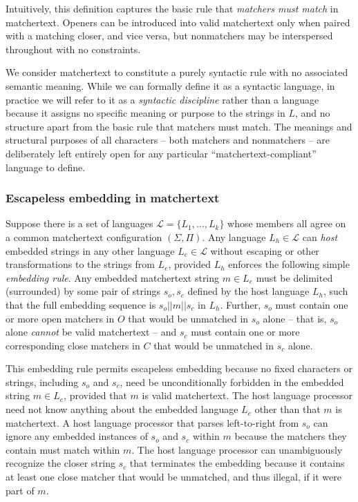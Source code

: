 Intuitively, this definition captures the basic rule
that \emph{matchers must match} in matchertext.
Openers can be introduced into valid matchertext
only when paired with a matching closer, and vice versa,
but nonmatchers may be interspersed throughout with no constraints.

We consider matchertext to constitute a purely syntactic rule
with no associated semantic meaning.
While we can formally define it as a syntactic language,
in practice we will refer to it as a \emph{syntactic discipline}
rather than a language
because it assigns no specific meaning or purpose to the strings in $L$,
and no structure apart from the basic rule that matchers must match.
The meanings and structural purposes of all characters --
both matchers and nonmatchers --
are deliberately left entirely open
for any particular ``matchertext-compliant'' language to define.


\subsubsection{Escapeless embedding in matchertext}
\label{sec:design:abstract:embed}

Suppose there is a set of languages $\mathcal{L} = \{L_1,\dots,L_k\}$
whose members all agree on a common  matchertext configuration $(\Sigma,\Pi)$.
Any language $L_h \in \mathcal{L}$ can \emph{host}
embedded strings in any other language $L_e \in \mathcal{L}$
without escaping or other transformations to the strings from $L_e$,
provided $L_h$ enforces the following simple \emph{embedding rule}.
Any embedded matchertext string $m \in L_e$ 
must be delimited (surrounded) by
some pair of strings $s_o, s_c$ defined by the host language $L_h$,
such that the full embedding sequence is $s_o || m || s_c$ in $L_h$.
Further, $s_o$ must contain one or more open matchers in $O$
that would be unmatched in $s_o$ alone --
that is, $s_o$ alone \emph{cannot} be valid matchertext --
and $s_c$ must contain one or more corresponding close matchers in $C$
that would be unmatched in $s_c$ alone.

This embedding rule permits escapeless embedding
because no fixed characters or strings, including $s_o$ and $s_c$,
need be unconditionally forbidden in the embedded string $m \in L_e$,
provided that $m$ is valid matchertext.
The host language processor need not know anything
about the embedded language $L_e$ other than that $m$ is matchertext.
A host language processor that parses left-to-right from $s_o$
can ignore any embedded instances of $s_o$ and $s_c$ within $m$
because the matchers they contain must match within $m$.
The host language processor can unambiguously recognize
the closer string $s_c$ that terminates the embedding
because it contains at least one close matcher
that would be unmatched, and thus illegal, if it were part of $m$.

